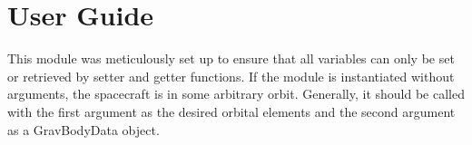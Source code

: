 \section{User Guide}
This module was meticulously set up to ensure that all variables can only be set or retrieved by setter and getter functions. If the module is instantiated without arguments, the spacecraft is in some arbitrary orbit. Generally, it should be called with the first argument as the desired orbital elements and the second argument as a GravBodyData object.
